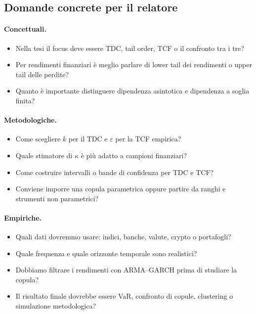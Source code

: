 \documentclass[11pt,a4paper]{article}
\begin{document}
\subsection{Domande concrete per il relatore}

\paragraph{Concettuali.}
\begin{itemize}
  \item Nella tesi il focus deve essere TDC, tail order, TCF o il confronto tra
  i tre?
  \item Per rendimenti finanziari è meglio parlare di lower tail dei rendimenti
  o upper tail delle perdite?
  \item Quanto è importante distinguere dipendenza asintotica e dipendenza a
  soglia finita?
\end{itemize}

\paragraph{Metodologiche.}
\begin{itemize}
  \item Come scegliere $k$ per il TDC e $\varepsilon$ per la TCF empirica?
  \item Quale stimatore di $\kappa$ è più adatto a campioni finanziari?
  \item Come costruire intervalli o bande di confidenza per TDC e TCF?
  \item Conviene imporre una copula parametrica oppure partire da ranghi e
  strumenti non parametrici?
\end{itemize}

\paragraph{Empiriche.}
\begin{itemize}
  \item Quali dati dovremmo usare: indici, banche, valute, crypto o portafogli?
  \item Quale frequenza e quale orizzonte temporale sono realistici?
  \item Dobbiamo filtrare i rendimenti con ARMA--GARCH prima di studiare la
  copula?
  \item Il risultato finale dovrebbe essere VaR, confronto di copule,
  clustering o simulazione metodologica?
\end{itemize}
\end{document}

